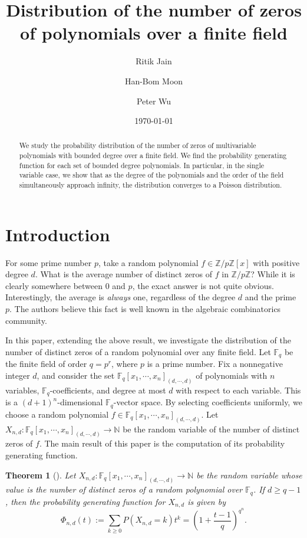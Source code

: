 \documentclass[12pt]{amsart}
\title{Distribution of the number of zeros of polynomials over a finite field}
\author{Ritik Jain}
\author{Han-Bom Moon}
\author{Peter Wu}
\date{\today}
\newtheorem{theorem}{Theorem}[section]
\theoremstyle{definition}
\newcommand{\FF}{\mathbb{F} }
\newcommand{\NN}{\mathbb{N} }
\newcommand{\ZZ}{\mathbb{Z} }
\begin{document}
\maketitle

\begin{abstract}
We study the probability distribution of the number of zeros of multivariable polynomials with bounded degree over a finite field. We find the probability generating function for each set of bounded degree polynomials. In particular, in the single variable case, we show that as the degree of the polynomials and the order of the field simultaneously approach infinity, the distribution converges to a Poisson distribution. 
\end{abstract}

\section{Introduction}

For some prime number $p$, take a random polynomial $f \in \ZZ/p \ZZ[x]$ with positive degree $d$. What is the average number of distinct zeros of $f$ in $\ZZ/p \ZZ$? While it is clearly somewhere between $0$ and $p$, the exact answer is not quite obvious. Interestingly, the average is \emph{always} one, regardless of the degree $d$ and the prime $p$. The authors believe this fact is well known in the algebraic combinatorics community. 

In this paper, extending the above result, we investigate the distribution of the number of distinct zeros of a random polynomial over any finite field. Let $\FF_q$ be the finite field of order $q = p^r$, where $p$ is a prime number. Fix a nonnegative integer $d$, and consider the set $\FF_q[x_1, \cdots, x_n]_{(d, \cdots, d)}$ of polynomials with $n$ variables, $\FF_q$-coefficients, and degree at most $d$ with respect to each variable. This is a $(d+1)^n$-dimensional $\FF_q$-vector space. By selecting coefficients uniformly, we choose a random polynomial $f \in \FF_q[x_1, \cdots, x_n]_{(d, \cdots, d)}$. Let $X_{n,d} : \FF_q[x_1, \cdots, x_n]_{(d, \cdots, d)} \to \NN$ be the random variable of the number of distinct zeros of $f$. The main result of this paper is the computation of its probability generating function. 

\begin{theorem}[]\label{thm:probabilitygeneratingfunction}
Let $X_{n,d} : \FF_q[x_1, \cdots, x_n]_{(d, \cdots, d)} \to \NN$ be the random variable whose value is the number of distinct zeros of a random polynomial over $\FF_q$. If $d \ge q-1$, then the probability generating function for $X_{n,d}$ is given by 
\[
    \Phi_{n,d}(t) := \sum_{k \ge 0}P(X_{n,d} = k)t^k
    = \left(1+\frac{t-1}{q}\right)^{q^n}.
\]
\end{theorem}
\end{document}

